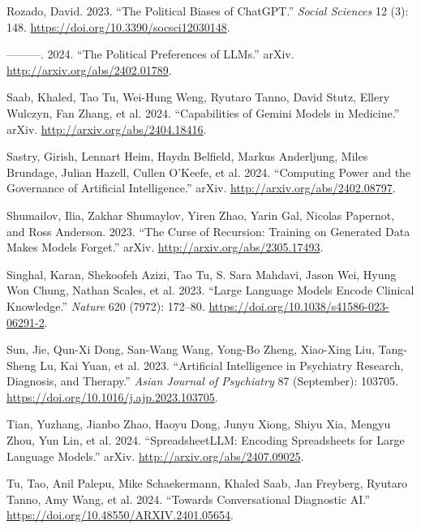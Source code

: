 \documentclass[
  Letterpaper,
]{scrbook}
\newlength{\cslhangindent}
\newenvironment{CSLReferences}[2] %
 {\begin{list}{}{%
  \setlength{\itemindent}{0pt}
  \setlength{\leftmargin}{0pt}
  \setlength{\parsep}{0pt}
  \ifodd #1
   \setlength{\leftmargin}{\cslhangindent}
   \setlength{\itemindent}{-1\cslhangindent}
  \fi
  \setlength{\itemsep}{#2\baselineskip}}}
 {\end{list}}
\begin{document}
\begin{CSLReferences}{1}{0}
Rozado, David. 2023. {``The {Political} {Biases} of {ChatGPT}.''}
\emph{Social Sciences} 12 (3): 148.
\url{https://doi.org/10.3390/socsci12030148}.

---------. 2024. {``The {Political} {Preferences} of {LLMs}.''} arXiv.
\url{http://arxiv.org/abs/2402.01789}.

Saab, Khaled, Tao Tu, Wei-Hung Weng, Ryutaro Tanno, David Stutz, Ellery
Wulczyn, Fan Zhang, et al. 2024. {``Capabilities of {Gemini} {Models} in
{Medicine}.''} arXiv. \url{http://arxiv.org/abs/2404.18416}.

Sastry, Girish, Lennart Heim, Haydn Belfield, Markus Anderljung, Miles
Brundage, Julian Hazell, Cullen O'Keefe, et al. 2024. {``Computing
{Power} and the {Governance} of {Artificial} {Intelligence}.''} arXiv.
\url{http://arxiv.org/abs/2402.08797}.

Shumailov, Ilia, Zakhar Shumaylov, Yiren Zhao, Yarin Gal, Nicolas
Papernot, and Ross Anderson. 2023. {``The {Curse} of {Recursion}:
{Training} on {Generated} {Data} {Makes} {Models} {Forget}.''} arXiv.
\url{http://arxiv.org/abs/2305.17493}.

Singhal, Karan, Shekoofeh Azizi, Tao Tu, S. Sara Mahdavi, Jason Wei,
Hyung Won Chung, Nathan Scales, et al. 2023. {``Large Language Models
Encode Clinical Knowledge.''} \emph{Nature} 620 (7972): 172--80.
\url{https://doi.org/10.1038/s41586-023-06291-2}.

Sun, Jie, Qun-Xi Dong, San-Wang Wang, Yong-Bo Zheng, Xiao-Xing Liu,
Tang-Sheng Lu, Kai Yuan, et al. 2023. {``Artificial Intelligence in
Psychiatry Research, Diagnosis, and Therapy.''} \emph{Asian Journal of
Psychiatry} 87 (September): 103705.
\url{https://doi.org/10.1016/j.ajp.2023.103705}.

Tian, Yuzhang, Jianbo Zhao, Haoyu Dong, Junyu Xiong, Shiyu Xia, Mengyu
Zhou, Yun Lin, et al. 2024. {``{SpreadsheetLLM}: {Encoding}
{Spreadsheets} for {Large} {Language} {Models}.''} arXiv.
\url{http://arxiv.org/abs/2407.09025}.

Tu, Tao, Anil Palepu, Mike Schaekermann, Khaled Saab, Jan Freyberg,
Ryutaro Tanno, Amy Wang, et al. 2024. {``Towards {Conversational}
{Diagnostic} {AI}.''} \url{https://doi.org/10.48550/ARXIV.2401.05654}.


\end{CSLReferences}
\end{document}
